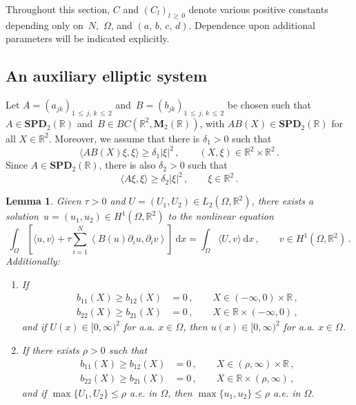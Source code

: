 \documentclass[10pt]{amsart}
\newtheorem{lemm}[theo]{Lemma}\newtheorem{prop}[theo]{Proposition}\newtheorem{coro}[theo]{Corollary}\newtheorem{conj}[theo]{Conjecture}
\theoremstyle{definition}\newtheorem{defi}[theo]{Definition}\newtheorem{rema}[theo]{Remark}\newtheorem{exam}[theo]{Example}\newtheorem{exem}[theo]{Example}\newtheorem{nota}[theo]{Notation}
\newcommand{\bbR}{\mathbb{R}}
\newcommand{\rmd}{\mathrm{d}}
\newcommand{\bfM}{\mathbf{M}}
\newcommand{\bSPD}{\mathbf{SPD}}
\newcommand*{\romanenumi}{\renewcommand*{\theenumi}{\roman{enumi}}}
\begin{document}
Throughout this section, $C$ and $(C_l)_{l\,\ge\,0}$ denote various positive constants depending only on~$N$,~$\Omega$, and $(a,\, b,\, c,\, d)$. Dependence upon additional parameters will be indicated explicitly.



\subsection{An auxiliary elliptic system}\label{sec2.1}



Let $A=(a_{jk})_{1\,\le\,j,\,k\,\le\,2}$ and~$B=(b_{jk})_{1\,\le\,j,\,k\,\le\,2}$ be chosen such that~${A\in \bSPD_2(\bbR)}$ and~${B\in BC(\bbR^2,\bfM_2(\bbR))}$, with $AB(X)\in \bSPD_2(\bbR)$ for all $X\in \bbR^2$. Moreover, we assume that there is $\delta_1>0$ such that
\begin{equation}\label{ap1}
\langle AB(X)\xi,\xi \rangle \ge \delta_1 |\xi|^2\,, \qquad (X,\xi)\in \bbR^2\times\bbR^2\,. 
\end{equation}
Since $A\in \bSPD_2(\bbR)$, there is also $\delta_2>0$ such that
\begin{equation}\label{ap2}
\langle A\xi,\xi \rangle \ge\delta_2 |\xi|^2\,, \qquad \xi\in\bbR^2\,. 
\end{equation}


\begin{lemm}\label{lem.ap1}
Given $\tau>0$ and $U=(U_1,U_2)\in L_2(\Omega,\bbR^2)$, there exists a solution~$u=(u_1,u_2)\in H^1(\Omega,\bbR^2)$ to the nonlinear equation
\begin{equation}\label{ap3}
\int_\Omega \left[\langle u, v \rangle + \tau \sum_{i=1}^N\left\langle B(u) \partial_i u, \partial_i v \right\rangle \right]\ \rmd x = \int_\Omega \langle U, v \rangle\ \rmd x\,, \qquad v\in H^1\left(\Omega,\bbR^2\right)\,. 
\end{equation}
Additionally:
\begin{enumerate}\romanenumi
\item\label{lemm2.2.i} If
\begin{equation}\label{ap10}
\begin{split}
b_{11}(X) \geq b_{12}(X) & = 0\,, \qquad X\in (-\infty,0)\times \bbR\,, \\
b_{22}(X) \geq b_{21}(X) & = 0\,, \qquad X\in \bbR\times (-\infty,0)\,,
\end{split} 
\end{equation}
and if $U(x)\in [0,\infty)^2$ for a.a. $x\in\Omega$, then $u(x)\in [0,\infty)^2$ for a.a. $x\in\Omega$.
\item\label{lemm2.2.ii} If there exists $\rho>0$ such that
\begin{equation}\label{ap10'}
\begin{split}
b_{11}(X) \geq b_{12}(X) & = 0\,, \qquad X\in (\rho,\infty)\times \bbR\,, \\
b_{22}(X) \geq b_{21}(X) & = 0\,, \qquad X\in \bbR\times (\rho,\infty)\,,
\end{split} 
\end{equation}
and if $\max\{U_1, U_2\} \leq \rho$ a.e. in $\Omega$, then $\max\{u_1, u_2\}\leq \rho$ a.e. in $\Omega$.
\end{enumerate}
\end{lemm}
\end{document}
